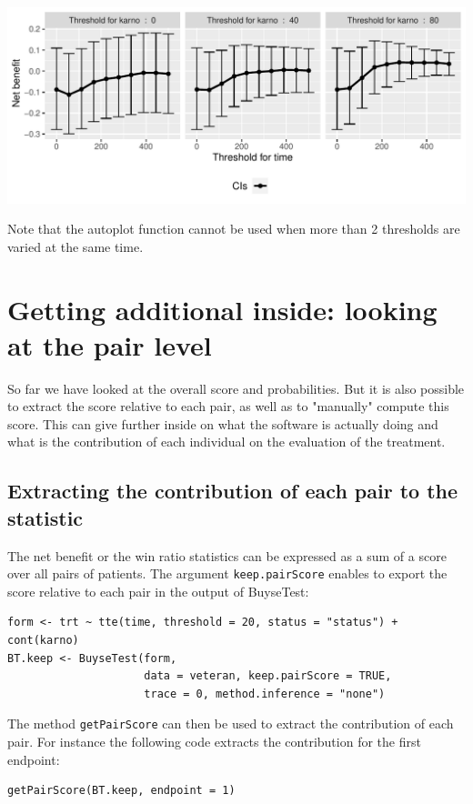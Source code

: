 \documentclass[12pt]{article}
\begin{document}
\begin{center}
\includegraphics[width=\textwidth]{./figures/gg-sensitivity2.pdf}
\end{center}

Note that the autoplot function cannot be used when more than 2
thresholds are varied at the same time.

\section{Getting additional inside: looking at the pair level}
\label{sec:orga688bd0}

So far we have looked at the overall score and probabilities. But it
is also possible to extract the score relative to each pair, as well
as to "manually" compute this score. This can give further inside on
what the software is actually doing and what is the contribution of
each individual on the evaluation of the treatment.

\subsection{Extracting the contribution of each pair to the statistic}
\label{sec:org45ed440}
The net benefit or the win ratio statistics can be expressed as a sum
of a score over all pairs of patients. The argument \texttt{keep.pairScore}
enables to export the score relative to each pair in the output of
BuyseTest:
\lstset{language=r,label= ,caption= ,captionpos=b,numbers=none}
\begin{lstlisting}
form <- trt ~ tte(time, threshold = 20, status = "status") + cont(karno)
BT.keep <- BuyseTest(form,
                     data = veteran, keep.pairScore = TRUE, 
                     trace = 0, method.inference = "none")
\end{lstlisting}

The method \texttt{getPairScore} can then be used to extract the contribution
of each pair. For instance the following code extracts the
contribution for the first endpoint:
\lstset{language=r,label= ,caption= ,captionpos=b,numbers=none}
\begin{lstlisting}
getPairScore(BT.keep, endpoint = 1)
\end{lstlisting}
\end{document}

